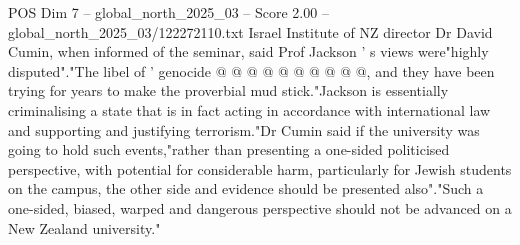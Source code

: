 \begin{textsample}{POS Dim 7 – global\_north\_2025\_03 – Score 2.00 – global\_north\_2025\_03/122272110.txt}
Israel Institute of NZ director Dr David Cumin, when informed of the seminar, said Prof Jackson ' s views were"highly disputed"."The libel of ' genocide @ @ @ @ @ @ @ @ @ @, and they have been trying for years to make the proverbial mud stick."Jackson is essentially criminalising a state that is in fact acting in accordance with international law and supporting and justifying terrorism."Dr Cumin said if the university was going to hold such events,"rather than presenting a one-sided politicised perspective, with potential for considerable harm, particularly for Jewish students on the campus, the other side and evidence should be presented also"."Such a one-sided, biased, warped and dangerous perspective should not be advanced on a New Zealand university."

\end{textsample}
